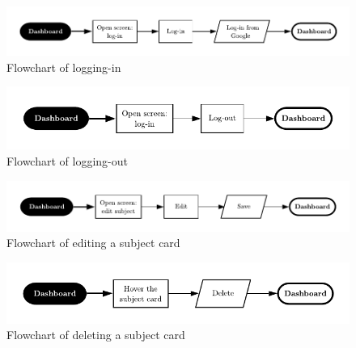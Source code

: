 \vfill
\begin{figure}[ht!]
    \vspace*{-1.5in}
    \includegraphics[scale=1]{media/diagrams/flowchart-login.pdf}
    \vspace*{-0.125in}
    \caption{Flowchart of logging-in}
    \label{flowchart-login}
\end{figure}
\vfill
\vspace*{-1.5in}
\begin{figure}[ht!]
    \includegraphics[scale=1]{media/diagrams/flowchart-logout.pdf}
    \vspace*{-0.125in}
    \caption{Flowchart of logging-out}
    \label{flowchart-logout}
\end{figure}
\vfill
\begin{figure}[ht!]
    \vspace*{-1.5in}
    \includegraphics[scale=1]{media/diagrams/flowchart-edit-subject.pdf}
    \vspace*{-0.125in}
    \caption{Flowchart of editing a subject card}
    \label{flowchart-edit-subject}
\end{figure}
\vfill
\begin{figure}[ht!]
    \vspace*{-1.5in}
    \includegraphics[scale=1]{media/diagrams/flowchart-delete-subject.pdf}
    \vspace*{-0.125in}
    \caption{Flowchart of deleting a subject card}
    \label{flowchart-delete-subject}
\end{figure}
